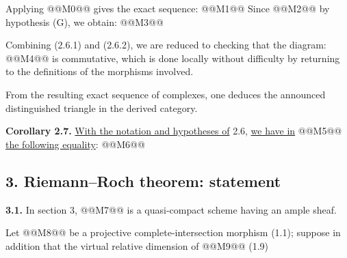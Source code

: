 Applying
@@M0@@ gives the exact sequence:
@@M1@@
Since @@M2@@ by hypothesis (G), we obtain:
@@M3@@

Combining (2.6.1) and (2.6.2), we are reduced to checking that the diagram:
@@M4@@
is commutative, which is done locally without difficulty by returning to the definitions of the morphisms involved.

From the resulting exact sequence of complexes, one deduces the announced distinguished triangle in the derived category.

\textbf{Corollary 2.7.} \uline{With the notation and hypotheses of} 2.6, \uline{we have in} @@M5@@ \uline{the following equality}:
@@M6@@

\subsection*{3. Riemann--Roch theorem: statement}

\textbf{3.1.} In section 3, @@M7@@ is a quasi-compact scheme having an ample sheaf.

Let @@M8@@ be a projective complete-intersection morphism (1.1); suppose in addition that the virtual relative dimension of @@M9@@ (1.9)

